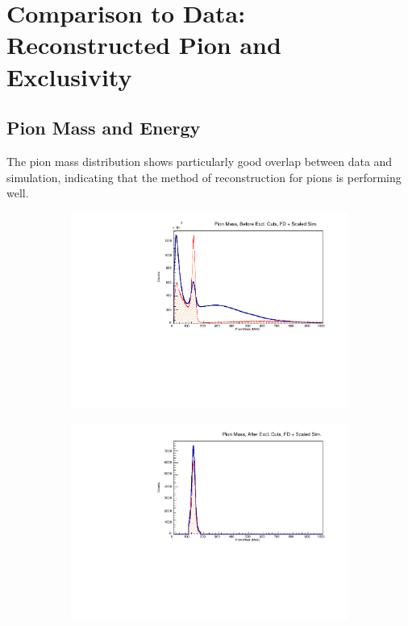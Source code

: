     \clearpage


\section{Comparison to Data: Reconstructed Pion and Exclusivity}

    \subsection{Pion Mass and Energy}
    The pion mass distribution shows particularly good overlap between data and simulation, indicating that the method of reconstruction for pions is performing well.

        \begin{figure}[!htb]
            \centering
            \begin{subfigure}{.5\textwidth}
                \centering
                \includegraphics[width=1\textwidth]{figures/Simulation/exclusivity/hist_pion_mass_prexcut_fd_Double.pdf}
            \end{subfigure}%
            \begin{subfigure}{.5\textwidth}
                \centering
                \includegraphics[width=1\textwidth]{figures/Simulation/exclusivity/hist_pion_mass_excut_fd_Double.pdf}

\end{subfigure}
\end{figure}
